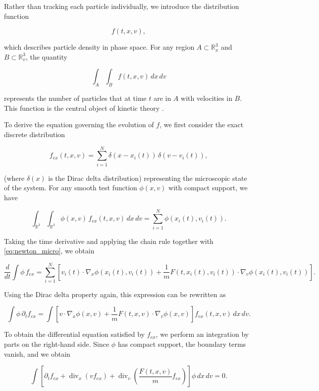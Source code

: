 \documentclass[11pt,a4paper,twoside,pdf]{article}
\numberwithin{equation}{section}
\begin{document}
\medskip

Rather than tracking each particle individually, we introduce the distribution function


\[
f(t,x,v),
\]


which describes particle density in phase space. For any region $A\subset\mathbb{R}^3_x$ and $B\subset\mathbb{R}^3_v$, the quantity


\[
\int_A\int_B f(t,x,v)\,dx\,dv
\]


represents the number of particles that at time $t$ are in $A$ with velocities in $B$. This function is the central object of kinetic theory \cite{romeroedp}.

\medskip


To derive the equation governing the evolution of $f$, we first consider the exact discrete distribution

\begin{equation}
f_{ex}(t,x,v)=\sum_{i=1}^N \delta(x-x_i(t))\,\delta(v-v_i(t)),
\label{eq:f_ex}
\end{equation}

(where $\delta(x)$ is the Dirac delta distribution) representing the microscopic state of the system. For any smooth test function $\phi(x,v)$ with compact support, we have


\[
\int_{\mathbb{R}^3}\int_{\mathbb{R}^3} \phi(x,v)\,f_{ex}(t,x,v)\,dx\,dv
= \sum_{i=1}^N \phi(x_i(t),v_i(t)).
\]



Taking the time derivative and applying the chain rule together with \eqref{eq:newton_micro}, we obtain


\[
\frac{d}{dt}\int \phi\,f_{ex}
= \sum_{i=1}^N \left[
v_i(t)\cdot\nabla_x\phi(x_i(t),v_i(t))
+ \frac{1}{m}F(t,x_i(t),v_i(t))\cdot\nabla_v\phi(x_i(t),v_i(t))
\right].
\]



Using the Dirac delta property again, this expression can be rewritten as


\[
\int \phi\,\partial_t f_{ex}
= \int \left[
v\cdot\nabla_x\phi(x,v)
+ \frac{1}{m}F(t,x,v)\cdot\nabla_v\phi(x,v)
\right] f_{ex}(t,x,v)\,dx\,dv.
\]



\medskip

To obtain the differential equation satisfied by $f_{ex}$, we perform an integration by parts on the right-hand side. Since $\phi$ has compact support, the boundary terms vanish, and we obtain


\[
\int \left[
\partial_t f_{ex}
+ \operatorname{div}_x(v f_{ex})
+ \operatorname{div}_v\!\left(\frac{F(t,x,v)}{m} f_{ex}\right)
\right]\phi\,dx\,dv = 0.
\]
\end{document}
